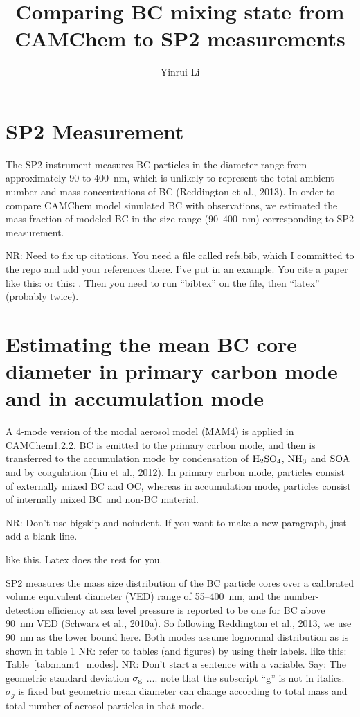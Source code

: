 \documentclass[11pt]{article}
\title{\textbf{Comparing BC mixing state from CAMChem to SP2 measurements}}
\author{Yinrui Li}
\date{}
\newcommand{\nrtodo}[1]{{\color{blue} NR: #1}}
\begin{document}
\maketitle



\section{SP2 Measurement} 

The SP2 instrument measures BC particles in the diameter range from
approximately 90 to 400~nm, which is unlikely to represent the total
ambient number and mass concentrations of BC (Reddington et al.,
2013).  In order to compare CAMChem model simulated BC with
observations, we estimated the mass fraction of modeled BC in the size
range (90--400~nm) corresponding to SP2 measurement.

\nrtodo{Need to fix up citations. You need a file called refs.bib,
  which I committed to the repo and add your references there. I've
  put in an example. You cite a paper like this:
  \citet{Reddington2013} or this: \citep{Reddington2013}.  Then you
  need to run ``bibtex'' on the file, then ``latex'' (probably
  twice).}
 
\section{Estimating the mean BC core diameter in primary carbon mode and in accumulation mode} 

A 4-mode version of the modal aerosol model (MAM4) is applied in
CAMChem1.2.2. BC is emitted to the primary carbon mode, and then is
transferred to the accumulation mode by condensation of
$\rm{H_2SO_4}$, $\rm{NH_3}$ and $\rm{SOA}$ and by coagulation (Liu et
al., 2012). In primary carbon mode, particles consist of externally
mixed BC and OC, whereas in accumulation mode, particles consist of
internally mixed BC and non-BC material.

\nrtodo{Don't use bigskip and noindent. If you want to make a new paragraph, just add a blank line.

  like this. Latex does the rest for you.}

\bigskip 
\noindent SP2 measures the mass size distribution of the BC particle
cores over a calibrated volume equivalent diameter (VED) range of
55--400~nm, and the number-detection efficiency at sea level pressure
is reported to be one for BC above 90~nm VED (Schwarz et al.,
2010a). So following Reddington et al., 2013, we use 90~nm as the
lower bound here.
\bigskip
\noindent Both modes assume lognormal distribution as is shown in
table 1 \nrtodo{refer to tables (and figures) by using their
  labels. like this: Table~\ref{tab:mam4_modes}}. \nrtodo{Don't start
  a sentence with a variable. Say: The geometric standard deviation
  $\sigma_{\rm g}$ .... note that the subscript ``g'' is not in
  italics.} $\sigma_{g}$ is fixed but geometric mean diameter can
change according to total mass and total number of aerosol particles
in that mode.
\end{document}
